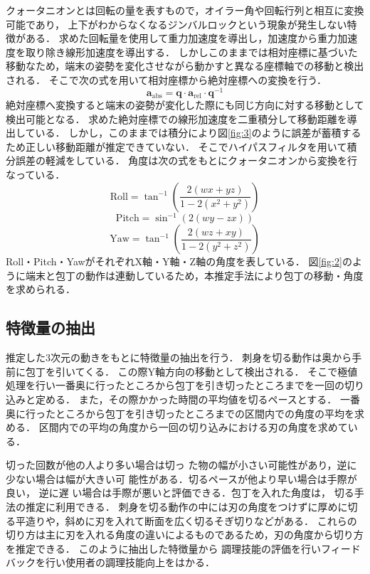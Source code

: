 クォータニオンとは回転の量を表すもので，オイラー角や回転行列と相互に変換可能であり，
上下がわからなくなるジンバルロックという現象が発生しない特徴がある．
求めた回転量を使用して重力加速度を導出し，加速度から重力加速度を取り除き線形加速度を導出する．
しかしこのままでは相対座標に基づいた移動なため，端末の姿勢を変化させながら動かすと異なる座標軸での移動と検出される．
そこで次の式を用いて相対座標から絶対座標への変換を行う．
\[
\mathbf{a}_{\text{abs}} = \mathbf{q} \cdot \mathbf{a}_{\text{rel}} \cdot \mathbf{q}^{-1}
\]
絶対座標へ変換すると端末の姿勢が変化した際にも同じ方向に対する移動として検出可能となる．
求めた絶対座標での線形加速度を二重積分して移動距離を導出している．
しかし，このままでは積分により図\ref{fig:3}のように誤差が蓄積するため正しい移動距離が推定できていない．
そこでハイパスフィルタを用いて積分誤差の軽減をしている．
角度は次の式をもとにクォータニオンから変換を行なっている．
    \[
	\text{Roll} = \tan^{-1}\left( \frac{2(w x + y z)}{1 - 2(x^2 + y^2)} \right)
	\]
	\[
	\text{Pitch} = \sin^{-1}\left( 2(w y - z x) \right)
	\]
	\[
	\text{Yaw} = \tan^{-1}\left( \frac{2(w z + x y)}{1 - 2(y^2 + z^2)} \right)
	\]
Roll・Pitch・YawがそれぞれX軸・Y軸・Z軸の角度を表している．
図\ref{fig:2}のように端末と包丁の動作は連動しているため，本推定手法により包丁の移動・角度を求められる．

\subsection{特徴量の抽出}
推定した3次元の動きをもとに特徴量の抽出を行う．
刺身を切る動作は奥から手前に包丁を引いてくる．
この際Y軸方向の移動として検出される．
そこで極値処理を行い一番奥に行ったところから包丁を引き切ったところまでを一回の切り込みと定める．
また，その際かかった時間の平均値を切るペースとする．
一番奥に行ったところから包丁を引き切ったところまでの区間内での角度の平均を求める．
区間内での平均の角度から一回の切り込みにおける刃の角度を求めている．

切った回数が他の人より多い場合は切っ
た物の幅が小さい可能性があり，逆に少ない場合は幅が大きい可
能性がある．切るペースが他より早い場合は手際が良い， 逆に遅
い場合は手際が悪いと評価できる．包丁を入れた角度は， 切る手法の推定に利用できる．
刺身を切る動作の中には刃の角度をつけずに厚めに切る平造りや，斜めに刃を入れて断面を広く切るそぎ切りなどがある．
これらの切り方は主に刃を入れる角度の違いによるものであるため，刃の角度から切り方を推定できる．
このように抽出した特徴量から
調理技能の評価を行いフィードバックを行い使用者の調理技能向上をはかる．
